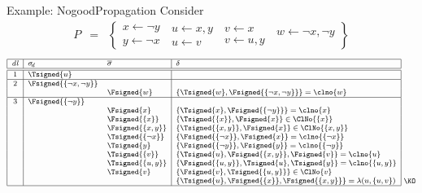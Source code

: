 \begin{frame}{Example: {NogoodPropagation}}
Consider
\begin{eqnarray*}
P
& = &
\left\{
  \begin{array}{l}
x  \leftarrow  \neg y\\%
y  \leftarrow  \neg x
\end{array}
\
\begin{array}{l}
u  \leftarrow x,y\\%
u  \leftarrow v%
\end{array}
\
\begin{array}{l}
v  \leftarrow x\\%
v  \leftarrow u,y%
\end{array}
\
\begin{array}{l}
w  \leftarrow \neg x,\neg y\\
\mbox{~}
\end{array}
\right\}
\end{eqnarray*}
%
\[
\footnotesize
\begin{array}[b]{|c|ll|l|}
\hline
\mathit{dl}& \sigma_{\!d} & \overline{\sigma} & \delta
\\\hline\hline
1 & \Tsigned{u} & &
\\\hline
2 & \Fsigned{\{\neg x,\neg y\}} & &
\\
  & & \Fsigned{w}     & \{\Tsigned{w},\Fsigned{\{\neg x,\neg y\}}\}=\clno{w}
\\\hline
3 & \Fsigned{\{\neg y\}} & &
\\
  & & \Fsigned{x}     & \{\Tsigned{x},\Fsigned{\{\neg y\}}\}=\clno{x}
\\
  & & \Fsigned{\{x\}} & \{\Tsigned{\{x\}},\Fsigned{x}\}\in\ClNo{\{x\}}
\\
  & & \Fsigned{\{x,y\}} & \{\Tsigned{\{x,y\}},\Fsigned{x}\}\in\ClNo{\{x,y\}}
\\
  & & \Tsigned{\{\neg x\}} & \{\Fsigned{\{\neg x\}},\Fsigned{x}\}=\clno{\{\neg x\}}
\\
  & & \Tsigned{y} & \{\Fsigned{\{\neg y\}},\Fsigned{y}\}=\clno{\{\neg y\}}
\\
  & & \Tsigned{\{v\}} & \{\Tsigned{u},\Fsigned{\{x,y\}},\Fsigned\{v\}\}=\clno{u}
\\
  & & \Tsigned{\{u,y\}} & \{\Fsigned{\{u,y\}},\Tsigned{u},\Tsigned{y}\}=\clno{\{u,y\}}
\\
  & & \Tsigned{v} & \{\Fsigned{v},\Tsigned{\{u,y\}}\}\in\ClNo{v}
\\
  & & & \{\Tsigned{u},\Fsigned{\{x\}},\Fsigned{\{x,y\}}\}=\lambda(u,\{u,v\})
\\\hline
\end{array}
~\raisebox{1mm}{\KO}
\]
\end{frame}

